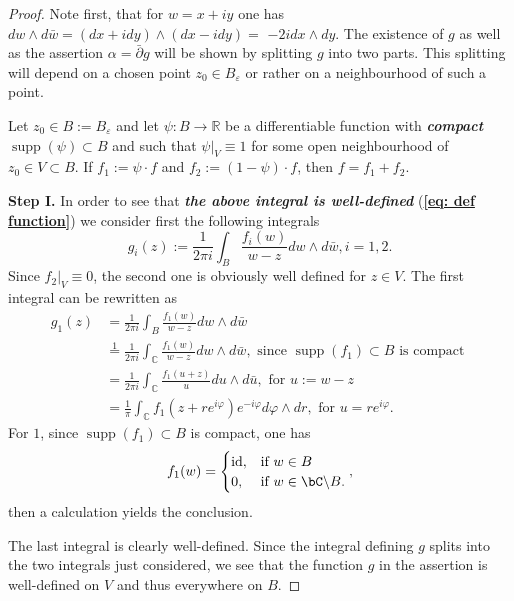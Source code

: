 \begin{proof}
  Note first, that for $w=x+i y$ one has $d w \wedge d \bar{w}=(d x+i d y) \wedge(d x-i d y)=$ $-2 i d x \wedge d y$. The existence of $g$ as well as the assertion $\alpha=\bar{\partial} g$ will be shown by splitting $g$ into two parts. This splitting will depend on a chosen point $z_0 \in B_{\varepsilon}$ or rather on a neighbourhood of such a point.

Let $z_0 \in B:=B_{\varepsilon}$ and let $\psi: B \rightarrow \mathbb{R}$ be a differentiable function with \textcolor[rgb]{0.83,0.21,0.51}{\textit{\textbf{compact}} $\operatorname{supp}(\psi) \subset B$} and such that \textcolor[rgb]{0.83,0.21,0.51}{$\left.\psi\right|_V \equiv 1$} for some open neighbourhood of $z_0 \in V \subset B$. If \textcolor[rgb]{0.50,0.00,0.50}{$f_1:=\psi \cdot f$ and $f_2:=(1-\psi) \cdot f$}, then $f=f_1+f_2$. 

\textbf{Step I.} In order to see that \textit{\textbf{the above integral is well-defined}} (\textbf{\ref{eq: def function}}) we consider first the following integrals
$$
g_i(z):=\frac{1}{2 \pi i} \int_B \frac{f_i(w)}{w-z} d w \wedge d \bar{w}, i=1,2 .
$$
Since \textcolor[rgb]{0.83,0.21,0.51}{$\left.f_2\right|_V \equiv 0$}, the second one is obviously well defined for $z \in V$. The first integral can be rewritten as
$$
\begin{aligned}
g_1(z) & =\frac{1}{2 \pi i} \int_B \frac{f_1(w)}{w-z} d w \wedge d \bar{w} \\
& \stackrel{1}{=}\frac{1}{2 \pi i} \int_{\mathbb{C}} \frac{f_1(w)}{w-z} d w \wedge d \bar{w}, \text { since } \operatorname{supp}\left(f_1\right) \subset B \text { is compact } \\
& =\frac{1}{2 \pi i} \int_{\mathbb{C}} \frac{f_1(u+z)}{u} d u \wedge d \bar{u}, \text { for } u:=w-z \\
& =\frac{1}{\pi} \int_{\mathbb{C}} f_1\left(z+r e^{i \varphi}\right) e^{-i \varphi} d \varphi \wedge d r, \text { for } u=r e^{i \varphi} .
\end{aligned}
$$
For $1$, since $\operatorname{supp}\left(f_1\right) \subset B$ is compact, one has
\[
  f_1 (w)=\begin{cases}
            \mathrm{id}, & \mbox{if } w\in B \\
            0, & \mbox{if }  w\in \bC\backslash B.
          \end{cases},
\]
then a calculation yields the conclusion.

The last integral is clearly well-defined. Since the integral defining $g$ splits into the two integrals just considered, we see that the function $g$ in the assertion is well-defined on $V$ and thus everywhere on $B$.


\end{proof}
